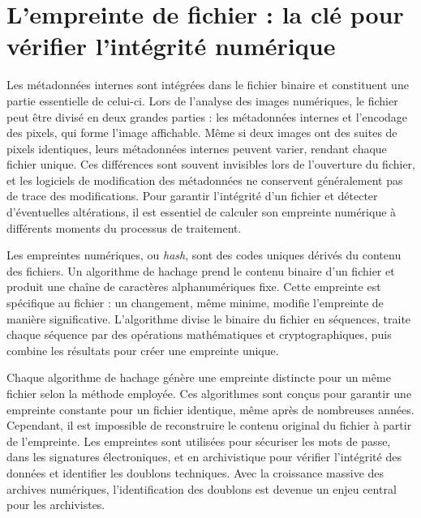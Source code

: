 \section{L'empreinte de fichier : la clé pour vérifier l'intégrité numérique}

Les métadonnées internes sont intégrées dans le fichier binaire et constituent une partie essentielle de celui-ci. Lors de l'analyse des images numériques, le fichier peut être divisé en deux grandes parties : les métadonnées internes et l'encodage des pixels, qui forme l'image affichable. Même si deux images ont des suites de pixels identiques, leurs métadonnées internes peuvent varier, rendant chaque fichier unique. Ces différences sont souvent invisibles lors de l'ouverture du fichier, et les logiciels de modification des métadonnées ne conservent généralement pas de trace des modifications. Pour garantir l'intégrité d'un fichier et détecter d'éventuelles altérations, il est essentiel de calculer son empreinte numérique à différents moments du processus de traitement.

Les empreintes numériques, ou \emph{hash}, sont des codes uniques dérivés du contenu des fichiers. Un algorithme de hachage prend le contenu binaire d'un fichier et produit une chaîne de caractères alphanumériques fixe. Cette empreinte est spécifique au fichier : un changement, même minime, modifie l'empreinte de manière significative. L'algorithme divise le binaire du fichier en séquences, traite chaque séquence par des opérations mathématiques et cryptographiques, puis combine les résultats pour créer une empreinte unique. 

Chaque algorithme de hachage génère une empreinte distincte pour un même fichier selon la méthode employée. Ces algorithmes sont conçus pour garantir une empreinte constante pour un fichier identique, même après de nombreuses années. Cependant, il est impossible de reconstruire le contenu original du fichier à partir de l'empreinte. Les empreintes sont utilisées pour sécuriser les mots de passe, dans les signatures électroniques, et en archivistique pour vérifier l'intégrité des données et identifier les doublons techniques. Avec la croissance massive des archives numériques, l'identification des doublons est devenue un enjeu central pour les archivistes.
